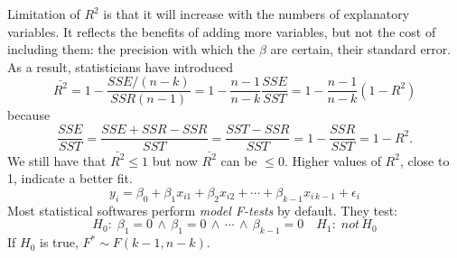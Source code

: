 			Limitation of $R^2$ is that it will increase with the numbers of explanatory variables. It reflects the benefits of adding more variables, but not the cost of including them: the precision with which the $\beta$ are certain, their standard error. As a result, statisticians have introduced
			\begin{equation*}
				\bar{R^2}=1-\frac{SSE/(n-k)}{SSR(n-1)}=1-\frac{n-1}{n-k}\frac{SSE}{SST}=1-\frac{n-1}{n-k}(1-R^2)
			\end{equation*} 
			because
			\begin{equation*}
				\frac{SSE}{SST}=\frac{SSE+SSR-SSR}{SST}=\frac{SST-SSR}{SST}=1-\frac{SSR}{SST}=1-R^2.
			\end{equation*}
			We still have that $\bar{R^2} \leq 1$ but now $\bar{R^2}$ can be $\leq 0$. Higher values of $R^2$, close to 1, indicate a better fit.
			\begin{equation*}
			y_i=\beta_0+\beta_1 x_{i1}+\beta_2 x_{i2}+\cdots+\beta_{k-1} x_{i\,k-1}+\epsilon_i
			\end{equation*}				
			Most statistical softwares perform \emph{model F-tests} by default. They test:
			\begin{equation*}
				H_0:\;\beta_1=0\,\wedge\,\beta_1=0\,\wedge\,\cdots\,\wedge\,\beta_{k-1}=0\quad H_1:\; not\,H_0
			\end{equation*}
			If $H_0$ is true, $F^*\sim F(k-1,n-k)$.
							
